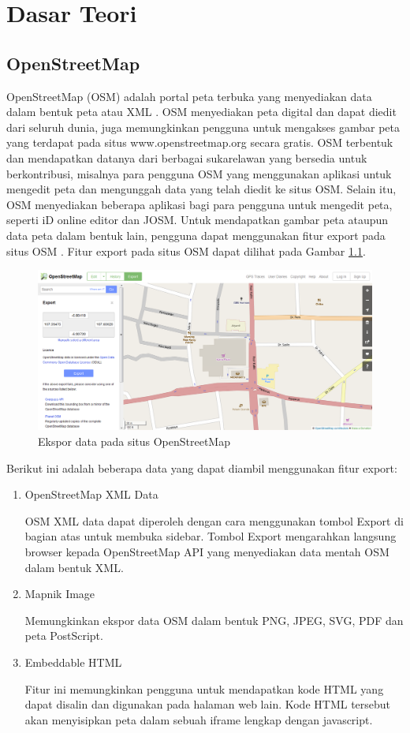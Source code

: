 \chapter{Dasar Teori}
\section{OpenStreetMap}
OpenStreetMap (OSM) adalah portal peta terbuka yang menyediakan data dalam bentuk peta atau 
XML \cite{wiki:001}. OSM menyediakan peta digital dan dapat diedit dari seluruh
dunia, juga memungkinkan pengguna untuk mengakses gambar peta yang terdapat pada situs www.openstreetmap.org 
secara gratis. OSM terbentuk dan mendapatkan datanya dari berbagai sukarelawan yang 
bersedia untuk berkontribusi, misalnya para pengguna OSM yang menggunakan aplikasi untuk 
mengedit peta dan mengunggah data yang telah diedit ke situs OSM. Selain itu, OSM menyediakan 
beberapa aplikasi bagi para pengguna untuk mengedit peta, seperti iD online editor dan JOSM. 
Untuk mendapatkan gambar peta ataupun data peta dalam bentuk lain, pengguna dapat menggunakan 
fitur export pada situs OSM \cite{wiki:002}. Fitur export pada situs OSM dapat
dilihat pada Gambar \ref{fig:export_osm}.
\begin{figure}[h]
\centering
\includegraphics[scale=0.4]{Gambar/export_osm}
\caption[Ekspor data pada situs OpenStreetMap]{Ekspor data pada situs
OpenStreetMap}
\label{fig:export_osm}
\end{figure}

Berikut ini adalah beberapa data yang dapat diambil menggunakan fitur export:
\begin{enumerate}
\item OpenStreetMap XML Data

OSM XML data dapat diperoleh dengan cara menggunakan tombol Export di bagian atas untuk 
membuka sidebar. Tombol Export mengarahkan langsung browser kepada OpenStreetMap API yang 
menyediakan data mentah OSM dalam bentuk XML.

\item Mapnik Image 

Memungkinkan ekspor data OSM dalam bentuk PNG, JPEG, SVG, PDF dan peta PostScript.

\item Embeddable HTML

Fitur ini memungkinkan pengguna untuk mendapatkan kode HTML yang dapat disalin dan digunakan pada halaman web lain. Kode HTML tersebut akan menyisipkan peta dalam sebuah iframe lengkap dengan javascript.
\end{enumerate}

